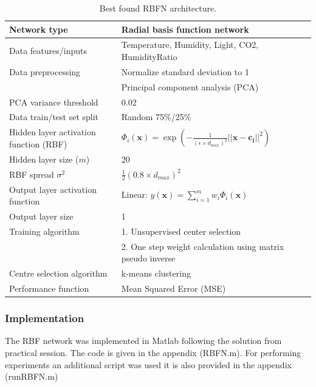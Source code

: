 \documentclass[a4paper, 11pt]{article}
\begin{document}
\begin{table}[h!]
\centering
\begin{tabular}{|l l|} 
 \hline
 Network type & Radial basis function network  \\ 
 \hline
 Data features/inputs & Temperature, Humidity, Light, CO2, HumidityRatio\\
 Data preprocessing & Normalize standard deviation to 1 \\
 & Principal component analysis (PCA) \\
 PCA variance threshold & 0.02 \\ 
 Data train/test set split & Random 75\%/25\% \\
 \hline
 Hidden layer activation function (RBF) & $
\Phi_i(\boldsymbol{x}) = \exp\left(-\frac{1}{(\epsilon \times d_{max})^2} \lvert\lvert \boldsymbol{x} -  \boldsymbol{c_i} \rvert\rvert ^2\right)  
$  \\
 Hidden layer size ($m$) & 20  \\
 RBF spread $\sigma^2$ & $\frac{1}{2}(0.8 \times d_{max})^2$   \\
 \hline
 Output layer activation function & Linear: $y(\boldsymbol{x}) = \displaystyle\sum_{i=1}^{m} w_i \Phi_i(\boldsymbol{x})$ \\
 Output layer size & 1 \\
 \hline
 Training algorithm & 1. Unsupervised center selection \\ 
 & 2. One step weight calculation using matrix pseudo inverse  \\
 Centre selection algorithm & k-means clustering \\
 Performance function & Mean Squared Error (MSE)  \\ [1ex] 
 \hline
\end{tabular}
\caption{Best found RBFN architecture.}
\label{table:architecture}
\end{table}

\subsubsection{Implementation}
The RBF network was implemented in Matlab following the solution from practical session. The code is given in the appendix (RBFN.m). For performing experiments an additional script was used it is also provided in the appendix (runRBFN.m)
\end{document}
